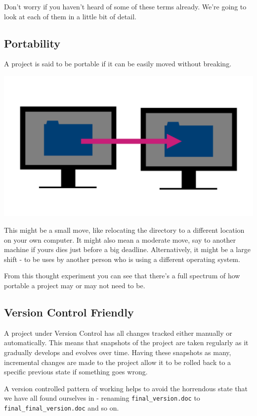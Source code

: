 \documentclass[
  12pt,
]{book}
\begin{document}
Don't worry if you haven't heard of some of these terms already. We're going to look at each of them in a little bit of detail.

\hypertarget{portability}{%
\subsection{Portability}\label{portability}}

A project is said to be portable if it can be easily moved without breaking.

\includegraphics[width=0.8\linewidth]{images/101-workflows-organising-your-work/directory-structure-drawings/directory-structure-drawing-2}

This might be a small move, like relocating the directory to a different location on your own computer. It might also mean a moderate move, say to another machine if yours dies just before a big deadline. Alternatively, it might be a large shift - to be uses by another person who is using a different operating system.

From this thought experiment you can see that there's a full spectrum of how portable a project may or may not need to be.

\hypertarget{version-control-friendly}{%
\subsection{Version Control Friendly}\label{version-control-friendly}}

A project under Version Control has all changes tracked either manually or automatically. This means that snapshots of the project are taken regularly as it gradually develops and evolves over time. Having these snapshots as many, incremental changes are made to the project allow it to be rolled back to a specific previous state if something goes wrong.

A version controlled pattern of working helps to avoid the horrendous state that we have all found ourselves in - renaming \texttt{final\_version.doc} to \texttt{final\_final\_version.doc} and so on.
\end{document}

